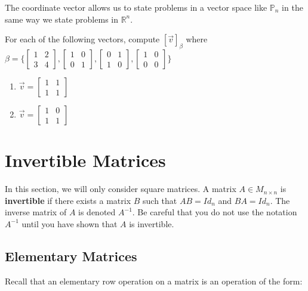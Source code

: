 The coordinate vector allows us to state problems in a vector space like $\mathbb{P}_n$ in the same way we state problems in $\mathbb{R}^n$.

\bq For each of the following vectors, compute $[\vec{v}]_{\beta}$ where $\beta =\{ \begin{bmatrix} 1&2\\3&4  \end{bmatrix}, \begin{bmatrix} 1&0\\0&1  \end{bmatrix}, \begin{bmatrix} 0&1\\1&0  \end{bmatrix}, \begin{bmatrix} 1&0\\0&0 \end{bmatrix} \}$
\begin{enumerate}
\item $\vec{v}=\begin{bmatrix} 1&1\\1&1  \end{bmatrix}$
\item $\vec{v}=\begin{bmatrix} 1&0\\1&1  \end{bmatrix}$
\end{enumerate}
\eq


\section{Invertible Matrices}

In this section, we will only consider square matrices. A matrix $A \in M_{n \times n}$ is \textbf{invertible} if there exists a matrix $B$ such that $AB=Id_n$ and $BA=Id_n$. The inverse matrix of $A$ is denoted $A^{-1}$. Be careful that you do not use the notation $A^{-1}$ until you have shown that $A$ is invertible.

\subsection{Elementary Matrices}

Recall that an elementary row operation on a matrix is an operation of the form:

